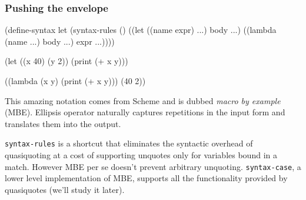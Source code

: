 \documentclass[hyperref={bookmarks=false}]{beamer}
\begin{document}
\begin{frame}[fragile]
\frametitle{Pushing the envelope}

\begin{lstlistinglike}
\begin{semiverbatim}
(define-syntax let
  (syntax-rules ()
    ((let ((name expr) ...) body ...)
     ((lambda (name ...) body ...) expr ...))))

(let ((x 40) (y 2)) (print (+ x y)))

((lambda (x y) (print (+ x y))) (40 2))
\end{semiverbatim}
\end{lstlistinglike}

This amazing notation comes from Scheme and is dubbed \emph{macro by example} (MBE).
Ellipsis operator naturally captures repetitions in the input form
and translates them into the output.

\texttt{syntax-rules} is a shortcut that eliminates the syntactic overhead of quasiquoting at a cost
of supporting unquotes only for variables bound in a match. However MBE per se doesn't prevent
arbitrary unquoting. \texttt{syntax-case}, a lower level implementation of MBE, supports all the
functionality provided by quasiquotes (we'll study it later).
\end{frame}
\end{document}
